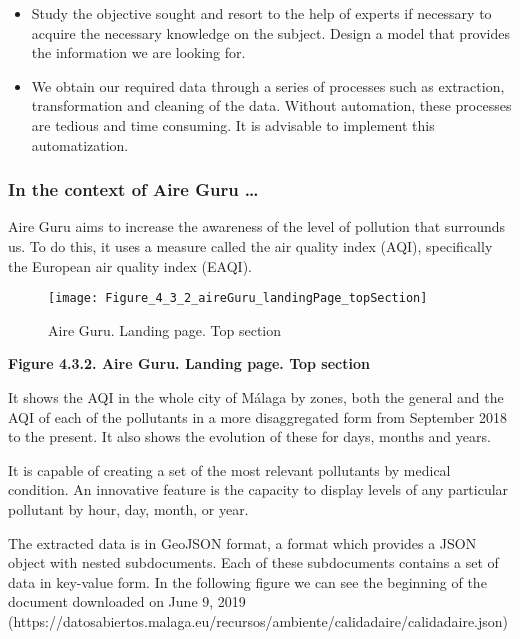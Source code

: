 \begin{itemize}
    \item Study the objective sought and resort to the help of experts if necessary to acquire the necessary knowledge on the subject.
    Design a model that provides the information we are looking for.

    \item We obtain our required data through a series of processes such as extraction, transformation and cleaning of the data.
    Without automation, these processes are tedious and time consuming.
    It is advisable to implement this automatization.
\end{itemize}

\subsubsection*{In the context of Aire Guru \ldots} 

Aire Guru aims to increase the awareness of the level of pollution that surrounds us.
To do this, it uses a measure called the air quality index (AQI), specifically the European air quality index (EAQI).

\begin{figure}[ht]
    \centering
    \texttt{[image: Figure\_4\_3\_2\_aireGuru\_landingPage\_topSection]}
    \caption{Aire Guru. Landing page. Top section}
\end{figure}
\begin{center}
    \bf{        
    Figure 4.3.2. Aire Guru. Landing page. Top section}
\end{center}

It shows the AQI in the whole city of Málaga by zones, both the general and the AQI of each of the pollutants in a more disaggregated form from September 2018 to the present.
It also shows the evolution of these for days, months and years.

It is capable of creating a set of the most relevant pollutants by medical condition.
An innovative feature is the capacity to display levels of any particular pollutant by hour, day, month, or year. 

The extracted data is in GeoJSON format, a format which provides a JSON object with nested subdocuments.
Each of these subdocuments contains a set of data in key-value form.
In the following figure we can see the beginning of the document downloaded on June 9, 2019 (https://datosabiertos.malaga.eu/recursos/ambiente/calidadaire/calidadaire.json) \\

